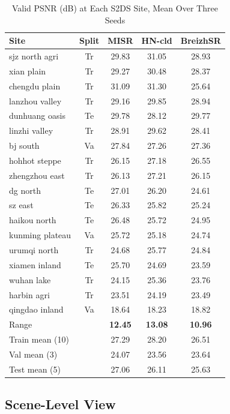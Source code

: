 \documentclass[journal]{IEEEtran}
\begin{document}
\begin{table}[!t]
\caption{Valid PSNR (dB) at Each S2DS Site, Mean Over Three Seeds}
\label{tab:main}
\centering
\scriptsize
\setlength{\tabcolsep}{2.6pt}
\renewcommand{\arraystretch}{0.90}
\begin{tabular}{lcccc}
\toprule
Site & Split & MISR & HN-cld & BreizhSR \\
\midrule
sjz north agri   & Tr & 29.83 & 31.05 & 28.93 \\
xian plain       & Tr & 29.27 & 30.48 & 28.37 \\
chengdu plain    & Tr & 31.09 & 31.30 & 25.64 \\
lanzhou valley   & Tr & 29.16 & 29.85 & 28.94 \\
dunhuang oasis   & Te & 29.78 & 28.12 & 29.77 \\
linzhi valley    & Tr & 28.91 & 29.62 & 28.41 \\
bj south         & Va & 27.84 & 27.26 & 27.36 \\
hohhot steppe    & Tr & 26.15 & 27.18 & 26.55 \\
zhengzhou east   & Tr & 26.13 & 27.21 & 26.15 \\
dg north         & Te & 27.01 & 26.20 & 24.61 \\
sz east          & Te & 26.33 & 25.82 & 25.24 \\
haikou north     & Te & 26.48 & 25.72 & 24.95 \\
kunming plateau  & Va & 25.72 & 25.18 & 24.74 \\
urumqi north     & Tr & 24.68 & 25.77 & 24.84 \\
xiamen inland    & Te & 25.70 & 24.69 & 23.59 \\
wuhan lake       & Tr & 24.15 & 25.36 & 23.76 \\
harbin agri      & Tr & 23.51 & 24.19 & 23.49 \\
qingdao inland   & Va & 18.64 & 18.23 & 18.82 \\
\midrule
Range            &    & \textbf{12.45} & \textbf{13.08} & \textbf{10.96} \\
Train mean (10)  &    & 27.29 & 28.20 & 26.51 \\
Val mean (3)     &    & 24.07 & 23.56 & 23.64 \\
Test mean (5)    &    & 27.06 & 26.11 & 25.63 \\
\bottomrule
\end{tabular}
\end{table}

\subsection{Scene-Level View}
\end{document}
